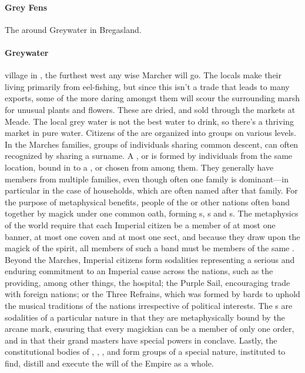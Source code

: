 \paragraph{Grey Fens} The  around Greywater in Bregasland.
\paragraph{Greywater} village in , the furthest west any wise Marcher will go. The locals make their living primarily from eel-fishing, but since this isn’t a trade that leads to many exports, some of the more daring amongst them will scour the surrounding marsh for unusual plants and flowers. These are dried, and sold through the markets at Meade. The local grey water is not the best water to drink, so there's a thriving market in pure water.
 Citizens of the  are organized into groups on various levels. \localpar {} In the Marches families, groups of individuals sharing common descent, can often recognized by sharing a surname. A ,  or  is formed by individuals from the same location, bound in  to a ,  or  chosen from among them. They generally have members from multiple families, even though often one family is dominant—in particular in the case of households, which are often named after that family. \localpar {} For the purpose of metaphysical benefits, people of the  or other nations often band together by magick under one common oath, forming s, s and s. The metaphysics of the world require that each Imperial citizen be a member of at most one banner, at most one coven and at most one sect, and because they draw upon the magick of the  spirit, all members of such a band must be members of the same . \localpar {} Beyond the Marches, Imperial citizens form sodalities representing a serious and enduring commitment to an Imperial cause across the nations, such as the  providing, among other things, the  hospital; the Purple Sail, encouraging trade with foreign nations; or the Three Refrains, which was formed by bards to uphold the musical traditions of the nations irrespective of political interests. The s are sodalities of a particular nature in that they are metaphysically bound by the  arcane mark, ensuring that every magickian can be a member of only one order, and in that their grand masters have special powers in conclave. \localpar {} Lastly, the constitutional bodies of , , ,  and  form groups of a special nature, instituted to find, distill and execute the will of the Empire as a whole.
\bigparagraphendtwiddle
